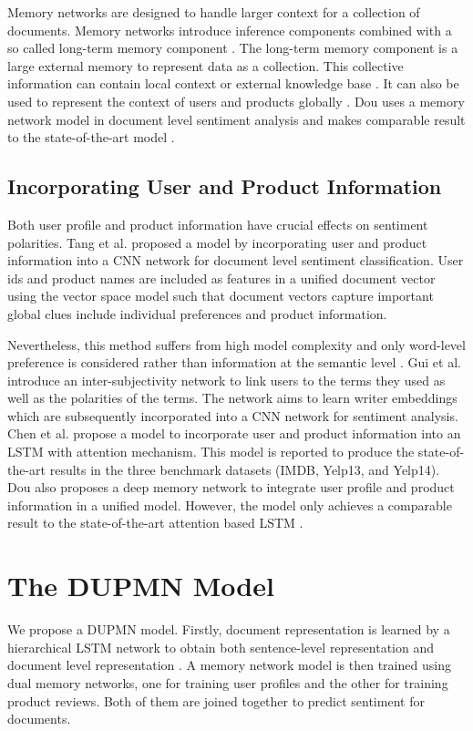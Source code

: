 \documentclass[11pt,a4paper]{article}
\begin{document}
Memory networks are designed to handle larger context for a collection of documents. Memory networks introduce inference components combined with a so called long-term memory component \cite{weston2014memory}. The long-term memory component is a large external memory to represent data as a collection. This collective information can contain local context \cite{das2017question} or external knowledge base \cite{jain2016question}. It can also be used to represent the context of users and products globally \cite{tang2016aspect}. Dou uses   a memory network model in document level sentiment analysis and makes comparable result to the state-of-the-art model \cite{chen2016neural}.

\subsection{Incorporating User and Product Information}\label{subsec:kbinsa} 
Both user profile and product information have crucial effects on sentiment polarities. Tang et al.  proposed a model by incorporating user and product information into a CNN network for document level sentiment classification. User ids and product names are included as features in a unified document vector using the vector space model such that document vectors capture important global clues include individual preferences and product information.

Nevertheless, this method suffers from high model complexity and only word-level preference is considered rather than information at the semantic level \cite{chen2016neural}. Gui et al.  introduce an inter-subjectivity network to link users to the terms they used as well as the polarities of the terms. The network aims to learn writer embeddings which are subsequently incorporated into a CNN network for sentiment analysis. Chen et al.  propose a model to incorporate user and product information into an LSTM with attention mechanism. This model is reported to produce the state-of-the-art results in the three benchmark datasets (IMDB, Yelp13, and Yelp14). Dou  also proposes a deep memory network to integrate user profile and product information in a unified model. However, the model only achieves a comparable result to the state-of-the-art attention based LSTM \cite{chen2016neural}.

\section{The DUPMN Model}\label{sec:proposaledmodel}
We propose a DUPMN model. Firstly, document representation is learned by a hierarchical LSTM network to obtain both sentence-level representation and document level representation  \cite{sundermeyer2012lstm}. A memory network model is then trained using dual memory networks, one for training user profiles and the other for training product reviews. Both of them are joined together to predict sentiment for documents.
\end{document}
